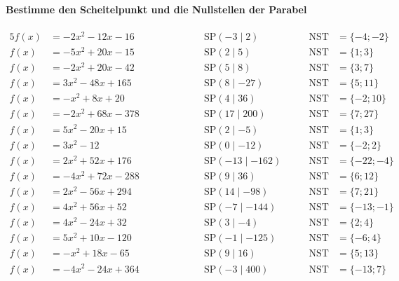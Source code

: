 \documentclass
[
  draft    = true,
  fontsize = 11pt,
  parskip  = half-,
  BCOR     = 0pt,
  DIV      = 11
]
{scrartcl}
\begin{document}
\paragraph{Bestimme den Scheitelpunkt und die Nullstellen der Parabel}
\begin{alignat*}{5}
  f(x)&=-2x^{2}-12x-16 \qquad&\qquad \quad&\text{SP}(-3\mid2) \quad&\quad \text{NST}&=\{-4;-2\} \\[0.5ex]
  f(x)&=-5x^{2}+20x-15 \qquad&\qquad \quad&\text{SP}(2\mid5) \quad&\quad \text{NST}&=\{1;3\} \\[0.5ex]
  f(x)&=-2x^{2}+20x-42 \qquad&\qquad \quad&\text{SP}(5\mid8) \quad&\quad \text{NST}&=\{3;7\} \\[0.5ex]
  f(x)&=3x^{2}-48x+165 \qquad&\qquad \quad&\text{SP}(8\mid-27) \quad&\quad \text{NST}&=\{5;11\} \\[0.5ex]
  f(x)&=-x^{2}+8x+20 \qquad&\qquad \quad&\text{SP}(4\mid36) \quad&\quad \text{NST}&=\{-2;10\} \\[0.5ex]
  f(x)&=-2x^{2}+68x-378 \qquad&\qquad \quad&\text{SP}(17\mid200) \quad&\quad \text{NST}&=\{7;27\} \\[0.5ex]
  f(x)&=5x^{2}-20x+15 \qquad&\qquad \quad&\text{SP}(2\mid-5) \quad&\quad \text{NST}&=\{1;3\} \\[0.5ex]
  f(x)&=3x^{2}-12 \qquad&\qquad \quad&\text{SP}(0\mid-12) \quad&\quad \text{NST}&=\{-2;2\} \\[0.5ex]
  f(x)&=2x^{2}+52x+176 \qquad&\qquad \quad&\text{SP}(-13\mid-162) \quad&\quad \text{NST}&=\{-22;-4\} \\[0.5ex]
  f(x)&=-4x^{2}+72x-288 \qquad&\qquad \quad&\text{SP}(9\mid36) \quad&\quad \text{NST}&=\{6;12\} \\[0.5ex]
  f(x)&=2x^{2}-56x+294 \qquad&\qquad \quad&\text{SP}(14\mid-98) \quad&\quad \text{NST}&=\{7;21\} \\[0.5ex]
  f(x)&=4x^{2}+56x+52 \qquad&\qquad \quad&\text{SP}(-7\mid-144) \quad&\quad \text{NST}&=\{-13;-1\} \\[0.5ex]
  f(x)&=4x^{2}-24x+32 \qquad&\qquad \quad&\text{SP}(3\mid-4) \quad&\quad \text{NST}&=\{2;4\} \\[0.5ex]
  f(x)&=5x^{2}+10x-120 \qquad&\qquad \quad&\text{SP}(-1\mid-125) \quad&\quad \text{NST}&=\{-6;4\} \\[0.5ex]
  f(x)&=-x^{2}+18x-65 \qquad&\qquad \quad&\text{SP}(9\mid16) \quad&\quad \text{NST}&=\{5;13\} \\[0.5ex]
  f(x)&=-4x^{2}-24x+364 \qquad&\qquad \quad&\text{SP}(-3\mid400) \quad&\quad \text{NST}&=\{-13;7\} \\[0.5ex]

\end{alignat*}
\end{document}
